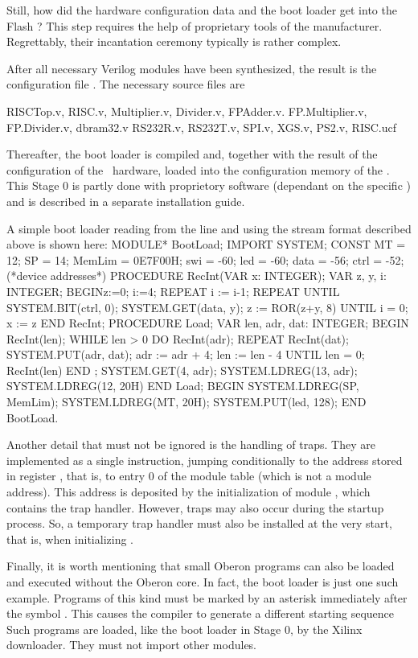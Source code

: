 Still, how did the hardware configuration data and the boot loader get into the Flash ? This step requires the help of proprietary tools of the  manufacturer. Regrettably, their incantation ceremony typically is rather complex.

After all necessary Verilog modules have been synthesized, the result is the configuration file . The necessary source files are

RISCTop.v, RISC.v, Multiplier.v, Divider.v, FPAdder.v. FP.Multiplier.v, FP.Divider.v, dbram32.v RS232R.v, RS232T.v, SPI.v, XGS.v, PS2.v, RISC.ucf

Thereafter, the boot loader is compiled and, together with the result of the configuration of the \RISC\ hardware, loaded into the configuration memory of the . This Stage 0 is partly done with proprietory software (dependant on the specific ) and is described in a separate installation guide.


A simple boot loader reading from the  line and using the stream format described above is shown here:
\begintt
MODULE* BootLoad;
IMPORT SYSTEM;
CONST MT = 12; SP = 14; MemLim = 0E7F00H;
swi = -60; led = -60; data = -56; ctrl = -52; (*device addresses*)
PROCEDURE RecInt(VAR x: INTEGER); VAR z, y, i: INTEGER;
BEGINz:=0; i:=4; REPEAT i := i-1;
REPEAT UNTIL SYSTEM.BIT(ctrl, 0);
SYSTEM.GET(data, y); z := ROR(z+y, 8) UNTIL i = 0;
x := z
END RecInt;
PROCEDURE Load;
VAR len, adr, dat: INTEGER;
BEGIN RecInt(len); WHILE len > 0 DO
RecInt(adr);
REPEAT RecInt(dat); SYSTEM.PUT(adr, dat); adr := adr + 4; len := len - 4 UNTIL len = 0; RecInt(len)
END ;
SYSTEM.GET(4, adr); SYSTEM.LDREG(13, adr); SYSTEM.LDREG(12, 20H) END Load;
BEGIN SYSTEM.LDREG(SP, MemLim); SYSTEM.LDREG(MT, 20H); SYSTEM.PUT(led, 128); END BootLoad.
\endtt

\noindent Another detail that must not be ignored is the handling of traps. They are implemented as a single  instruction, jumping conditionally to the address stored in register , that is, to entry 0 of the module table (which is not a module address). This address is deposited by the initialization of module , which contains the trap handler. However, traps may also occur during the startup process. So, a temporary trap handler must also be installed at the very start, that is, when initializing .

Finally, it is worth mentioning that small Oberon programs can also be loaded and executed without the Oberon core. In fact, the boot loader is just one such example. Programs of this kind must be marked by an asterisk immediately after the symbol . This causes the compiler to generate a different starting sequence Such programs are loaded, like the boot loader in Stage 0, by the Xilinx downloader. They must not import other modules.


